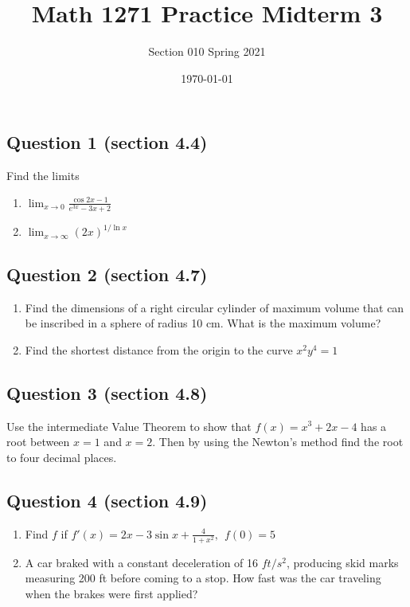 \documentclass[12pt]{amsart}
\title{Math 1271 Practice Midterm 3 }
\author{Section 010 Spring 2021}
\date{\today}
\theoremstyle{plain}
\theoremstyle{definition}
\begin{document}
	\maketitle
	
	\setcounter{tocdepth}{1}
	
\subsection*{Question 1 (section 4.4)} Find the limits
\begin{enumerate}
\item $\displaystyle \lim_{x\rightarrow 0} \frac{\cos 2x-1}{e^{3x}-3x+2}$\vspace{3cm}
\item $\displaystyle \lim_{x\rightarrow \infty} (2x)^{1/\ln x}$\vspace{3cm}
\end{enumerate}
\subsection*{Question 2 (section 4.7)} 
\begin{enumerate}
\item Find the dimensions of a right circular cylinder of maximum volume that can be inscribed in a sphere of radius 10 cm. What is the
maximum volume?\vspace{4cm}

\item Find the shortest distance from the origin to the curve $x^2y^4 = 1$\vspace{3cm}
\end{enumerate}\newpage
\subsection*{Question 3 (section 4.8)}
Use the intermediate Value Theorem to show
that $f(x)=x^3+2x- 4$ has a root between $x=1$ and $x=2$.
Then by using the Newton's method find the root to four decimal places.
\vspace{4cm}
\subsection*{Question 4 (section 4.9)}
\begin{enumerate}
\item Find $f$ if
$\displaystyle f'(x)=2x-3\sin x+\frac{4}{1+x^2}, \ \ f(0)=5$\vspace{4cm}

\item A car braked with a constant deceleration of 16 $ft/s^2$, producing skid marks measuring 200 ft before coming to a stop. How fast was the car traveling when the brakes were first applied?\vspace{4cm}
\end{enumerate}
\end{document}
